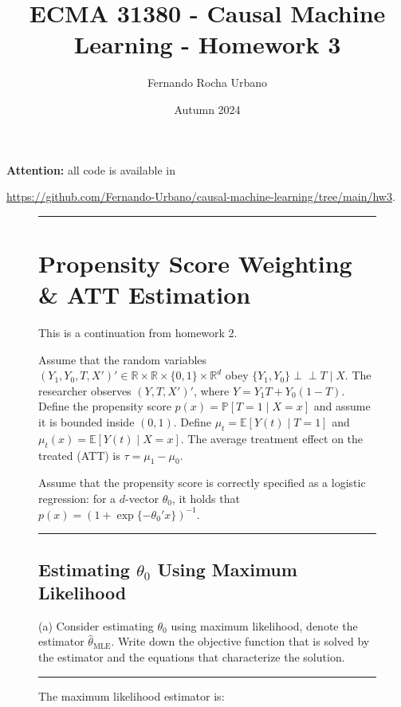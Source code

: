\documentclass{article}
\title{ECMA 31380 - Causal Machine Learning - Homework 3}
\author{Fernando Rocha Urbano}
\date{Autumn 2024}
\newenvironment{colorparagraph}[1]{\par\color{#1}}{\par}
\begin{document}
\maketitle

\textbf{Attention:} all code is available in

\url{https://github.com/Fernando-Urbano/causal-machine-learning/tree/main/hw3}.

\begin{figure}[H]
\begin{colorparagraph}{questioncolor}
\rule{\textwidth}{0.5pt}
\label{q1}
\section{Propensity Score Weighting \& ATT Estimation}

This is a continuation from homework 2.

Assume that the random variables \((Y_1, Y_0, T, X')' \in \mathbb{R} \times \mathbb{R} \times \{0, 1\} \times \mathbb{R}^d\) obey \(\{Y_1, Y_0\} \perp\!\!\!\perp T \mid X\).
The researcher observes \((Y, T, X')'\), where \( Y = Y_1 T + Y_0 (1 - T) \).
Define the propensity score \( p(x) = \mathbb{P}[T = 1 \mid X = x] \) and assume it is bounded inside \( (0, 1) \).
Define \( \mu_t = \mathbb{E}[Y(t) \mid T = 1] \) and \( \mu_t(x) = \mathbb{E}[Y(t) \mid X = x] \).
The average treatment effect on the treated (ATT) is \( \tau = \mu_1 - \mu_0 \).

Assume that the propensity score is correctly specified as a logistic regression: for a \( d \)-vector \( \theta_0 \), it holds that \( p(x) = (1 + \exp\{-\theta_0' x\})^{-1} \).

\end{colorparagraph}

\begin{colorparagraph}{questioncolor}
\label{q1a}
\rule{\textwidth}{0.5pt}
\subsection{Estimating \( \theta_0 \) Using Maximum Likelihood}
(a) Consider estimating \( \theta_0 \) using maximum likelihood, denote the estimator \( \hat{\theta}_{\text{MLE}} \).
Write down the objective function that is solved by the estimator and the equations that characterize the solution.

\rule{\textwidth}{0.5pt}
\end{colorparagraph}

The maximum likelihood estimator is:
\end{figure}
\end{document}
